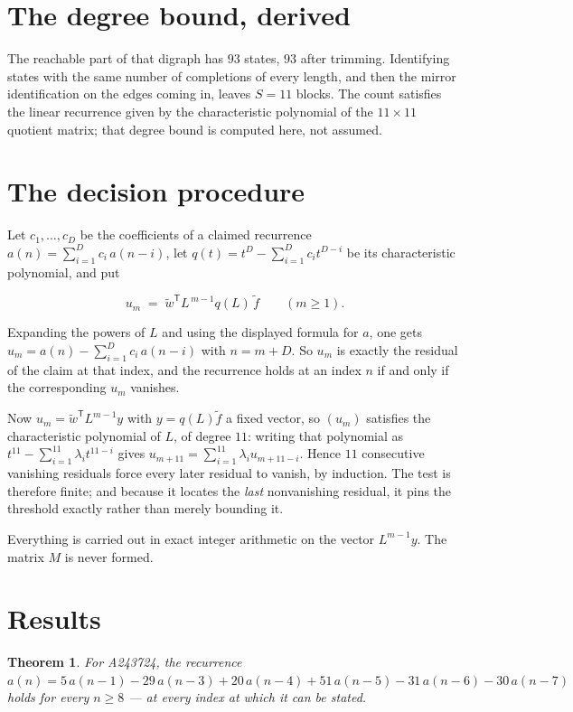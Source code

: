\documentclass[11pt]{article}
\newtheorem{theorem}{Theorem}
\theoremstyle{definition}
\begin{document}
\section{The degree bound, derived}

The reachable part of that digraph has $93$ states, $93$ after trimming. Identifying states with the same number of completions of every length, and then the mirror identification on the edges coming in, leaves $S = 11$ blocks. The count satisfies the linear recurrence given by the characteristic polynomial of the $11\times11$ quotient matrix; that degree bound is computed here, not assumed.

\section{The decision procedure}

Let $c_1,\dots,c_D$ be the coefficients of a claimed recurrence $a(n) = \sum_{i=1}^{D} c_i\,a(n-i)$, let $q(t) = t^{D} - \sum_{i=1}^{D} c_i t^{D-i}$ be its characteristic polynomial, and put

\[u_m \;=\; \tilde w^{\mathsf T} L^{\,m-1} q(L)\,\tilde f \qquad (m \ge 1).\]

Expanding the powers of $L$ and using the displayed formula for $a$, one gets $u_m = a(n) - \sum_{i=1}^{D} c_i\,a(n-i)$ with $n = m + D$. So $u_m$ is exactly the residual of the claim at that index, and the recurrence holds at an index $n$ if and only if the corresponding $u_m$ vanishes.

Now $u_m = \tilde w^{\mathsf T} L^{m-1} y$ with $y = q(L)\tilde f$ a fixed vector, so $(u_m)$ satisfies the characteristic polynomial of $L$, of degree $11$: writing that polynomial as $t^{11} - \sum_{i=1}^{11} \lambda_i t^{11-i}$ gives $u_{m+11} = \sum_{i=1}^{11} \lambda_i u_{m+11-i}$. Hence $11$ consecutive vanishing residuals force every later residual to vanish, by induction. The test is therefore finite; and because it locates the {\itshape last} nonvanishing residual, it pins the threshold exactly rather than merely bounding it.

Everything is carried out in exact integer arithmetic on the vector $L^{m-1}y$. The matrix $M$ is never formed.

\section{Results}

\begin{theorem} For A243724, the recurrence $a(n) = 5\,a(n-1) - 29\,a(n-3) + 20\,a(n-4) + 51\,a(n-5) - 31\,a(n-6) - 30\,a(n-7)$ holds for every $n \ge 8$ --- at every index at which it can be stated.\end{theorem}
\end{document}

